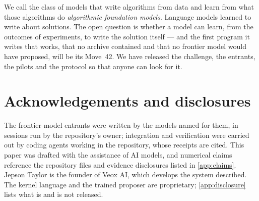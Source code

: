 We call the class of models that write algorithms from data and learn from what those algorithms do
\emph{algorithmic foundation models}. Language models learned to write about solutions. The open
question is whether a model can learn, from the outcomes of experiments, to write the solution itself
--- and the first program it writes that works, that no archive contained and that no frontier model
would have proposed, will be its Move~42. We have released the challenge, the entrants, the pilots and
the protocol so that anyone can look for it.

\section*{Acknowledgements and disclosures}
The frontier-model entrants were written by the models named for them, in sessions run by the
repository's owner; integration and verification were carried out by coding agents working in the
repository, whose receipts are cited. This paper was drafted with the assistance of AI models,
and numerical claims reference the repository files and evidence disclosures listed in \cref{app:claims}. Jepson
Taylor is the founder of Veox AI, which develops the system described. The kernel language and the
trained proposer are proprietary; \cref{app:disclosure} lists what is and is not released.
